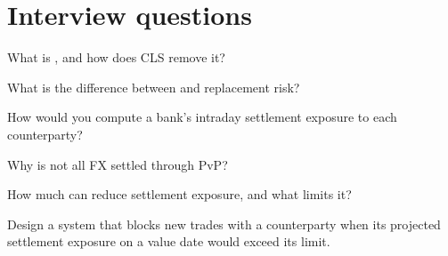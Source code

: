 \section{Interview questions}

\begin{interviewq}\label{iq:m2:settlement-risk:1}
What is , and how does CLS remove it?
\end{interviewq}

\begin{interviewq}\label{iq:m2:settlement-risk:2}
What is the difference between  and replacement risk?
\end{interviewq}

\begin{interviewq}\label{iq:m2:settlement-risk:3}
How would you compute a bank's intraday settlement exposure to each counterparty?
\end{interviewq}

\begin{interviewq}\label{iq:m2:settlement-risk:4}
Why is not all FX settled through PvP?
\end{interviewq}

\begin{interviewq}\label{iq:m2:settlement-risk:5}
How much can  reduce settlement exposure, and what limits it?
\end{interviewq}

\begin{interviewq}\label{iq:m2:settlement-risk:6}
Design a system that blocks new trades with a counterparty when its projected
settlement exposure on a value date would exceed its limit.
\end{interviewq}

